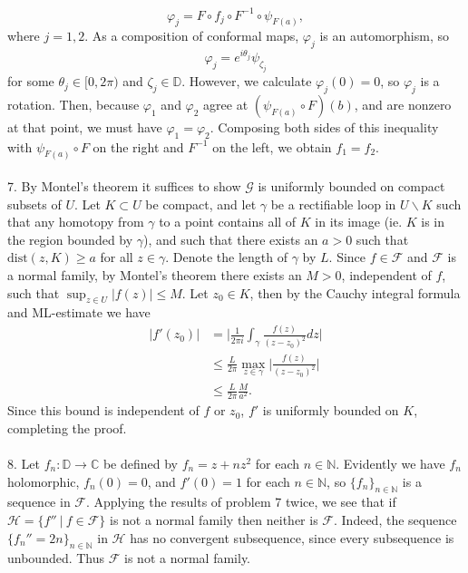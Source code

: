 \documentclass{article}
\newcommand{\N}{\mathbb{N}}
\newcommand{\C}{\mathbb{C}}
\newcommand{\D}{\mathbb{D}}
\begin{document}
$$
\varphi_j = F\circ f_j \circ F^{-1} \circ \psi_{F(a)},
$$
where $j = 1,2$. As a composition of conformal maps, $\varphi_j$ is an automorphism, so 
$$
\varphi_j = e^{i\theta_j} \psi_{\zeta_j}
$$
for some $\theta_j \in [0,2\pi)$ and $\zeta_j \in \D$. However, we calculate $\varphi_j(0) = 0$, so $\varphi_j$ is a rotation. Then, because $\varphi_1$ and $\varphi_2$ agree at $(\psi_{F(a)} \circ F)(b)$, and are nonzero at that point, we must have $\varphi_1 = \varphi_2$. Composing both sides of this inequality with $\psi_{F(a)} \circ F$ on the right and $F^{-1}$ on the left, we obtain $f_1 = f_2$.
\\ \\
7. By Montel's theorem it suffices to show $\mathcal{G}$ is uniformly bounded on compact subsets of $U$. Let $K \subset U$ be compact, and let $\gamma$ be a rectifiable loop in $U \backslash K$ such that any homotopy from $\gamma$ to a point contains all of $K$ in its image (ie. $K$ is in the region bounded by $\gamma$), and such that there exists an $a>0$ such that $\text{dist}(z, K) \geq a$ for all $z\in \gamma$.  Denote the length of $\gamma$ by $L$. Since $f\in \mathcal{F}$ and $\mathcal{F}$ is a normal family, by Montel's theorem there exists an $M>0$, independent of $f$, such that $\sup_{z\in U}|f(z)| \leq M$. Let $z_0 \in K$, then by the Cauchy integral formula and ML-estimate we have
\begin{align*}
    |f'(z_0)| &= \Big|\frac{1}{2\pi i} \int_{\gamma} \frac{f(z)}{(z-z_0)^2}dz\Big| \\ 
    &\leq \frac{L}{2\pi} \max_{z\in \gamma}\Big| \frac{f(z)}{(z-z_0)^2}\Big| \\
    &\leq \frac{L}{2\pi}\frac{M}{a^2}.
\end{align*}
Since this bound is independent of $f$ or $z_0$, $f'$ is uniformly bounded on $K$, completing the proof. 
\\ \\
8. Let $f_n:\D \to \C$ be defined by $f_n= z+nz^2$ for each $n\in \N$. Evidently we have $f_n$ holomorphic, $f_n(0) =0$, and $f'(0) = 1$ for each $n\in \N$, so $\{f_n\}_{n\in \N}$ is a sequence in $\mathcal{F}$. Applying the results of problem 7 twice, we see that if $\mathcal{H} = \{f'' \:|\: f \in \mathcal{F}\}$ is not a normal family then neither is $\mathcal{F}$. Indeed, the sequence $\{f_n'' = 2n\}_{n\in \N}$ in $\mathcal{H}$ has no convergent subsequence, since  every subsequence is unbounded. Thus $\mathcal{F}$ is not a normal family. 
\\ \\
\end{document}
